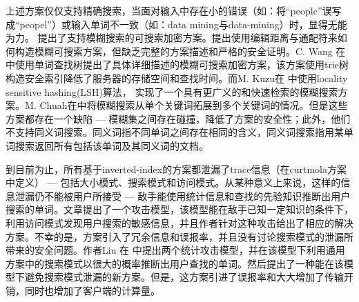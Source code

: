 
上述方案仅仅支持精确搜索，当面对输入中存在小的错误（如：将“people”误写成“peopel”）或输入单词不一致（如：data mining与data-mining）时，显得无能为力。
\cite{li2010fuzzy}\cite{wang2012achieving}\cite{kuzu2012efficient}提出了支持模糊搜索的可搜索加密方案。\cite{li2010fuzzy}提出使用编辑距离与通配符来如何构造模糊可搜索方案，但缺乏完整的方案描述和严格的安全证明。C. Wang 在\cite{wang2012achieving}中使用单词查找树提出了具体详细描述的模糊可搜索加密方案，该方案使用trie树构造安全索引降低了服务器的存储空间和查找时间。而M. Kuzu在
\cite{kuzu2012efficient}中使用locality sensitive hashing(LSH)算法\cite{indyk1998approximate}， 实现了一个具有更广义的和快速检索的模糊搜索方案。M. Chuah在\cite{chuah2011privacy}中将模糊搜索从单个关键词拓展到多个关键词的情况。但是这些方案都存在一个缺陷 --- 模糊集之间存在碰撞，降低了方案的安全性；此外，他们不支持同义词搜索。同义词指不同单词之间存在相同的含义，同义词搜索指用某单词搜索返回所有包括该单词及其同义词的文档。

到目前为止，所有基于inverted-index的方案都泄漏了trace信息（在curtmola方案中定义） --- 包括大小模式、搜索模式和访问模式。从某种意义上来说，这样的信息泄漏仍不能被用户所接受 --- 敌手能使用统计信息和查找的先验知识推断出用户搜索的单词。文章\cite{islam2012access}提出了一个攻击模型，该模型能在敌手已知一定知识的条件下，利用访问模式发现用户搜索的敏感信息，并且作者针对这种攻击给出了相应的解决方案。不幸的是，方案引入了冗余信息和误报率，并且没有讨论搜索模式的泄漏所带来的安全问题。作者Liu 在\cite{liu2014search} 中提出两个统计攻击模型，并在该模型下利用通用方案中的搜索模式以很大的概率推断出用户查找的单词。然后提出了一种能在该模型下避免搜索模式泄漏的新方案。但是，这方案引进了误报率和大大增加了传输开销，同时也增加了客户端的计算量。





